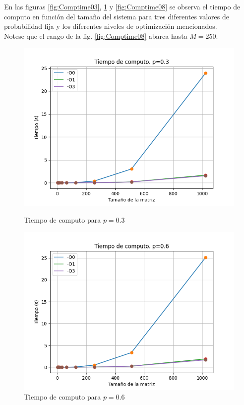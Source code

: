 \documentclass[11pt,twocolumn]{article}
\begin{document}
En las figuras \ref{fig:Comptime03}, \ref{fig:Comptime06} y \ref{fig:Comptime08} se observa el tiempo de computo en función del tamaño del sistema para tres diferentes valores de probabilidad fija y los diferentes niveles de optimización mencionados.\\
Notese que el rango de la fig. \ref{fig:Comptime08} abarca hasta $M=250$.
\begin{figure}
    \centering
    \includegraphics[width=1\linewidth]{Imagenes/Computing_time_p03.png}
    \caption{Tiempo de computo para $p=0.3$}
    \label{fig:Comptime03}

    \includegraphics[width=1\linewidth]{Imagenes/Computing_time_p06.png}
    \caption{Tiempo de computo para $p=0.6$}
    \label{fig:Comptime06}


\end{figure}
\end{document}
